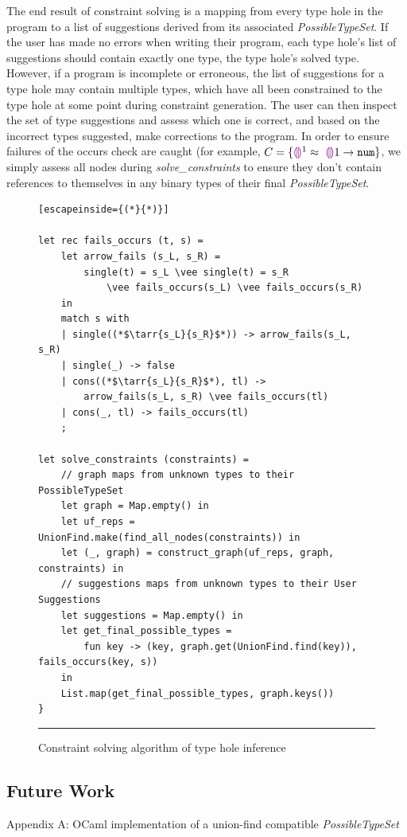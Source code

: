 The end result of constraint solving is a mapping from every type hole in the program to a list of suggestions derived from its associated \textit{PossibleTypeSet}. If the user has made no errors when writing their program, each type hole's list of suggestions should contain exactly one type, the type hole's solved type. However, if a program is incomplete or erroneous, the list of suggestions for a type hole may contain multiple types, which have all been constrained to the type hole at some point during constraint generation. The user can then inspect the set of type suggestions and assess which one is correct, and based on the incorrect types suggested, make corrections to the program. In order to ensure failures of the occurs check are caught (for example, $C = \{ \textcolor{violet}{\llparenthesis}\textcolor{violet}{\rrparenthesis}^{1} \approx~ \textcolor{violet}{\llparenthesis}\textcolor{violet}{\rrparenthesis}{1} \rightarrow \mathtt{num} \}$, we simply assess all nodes during \textit{solve\_constraints} to ensure they don't contain references to themselves in any binary types of their final \textit{PossibleTypeSet}.

\begin{figure}[htbp]
\begin{lstlisting}[escapeinside={(*}{*)}]

let rec fails_occurs (t, s) =
    let arrow_fails (s_L, s_R) =
        single(t) = s_L \vee single(t) = s_R 
            \vee fails_occurs(s_L) \vee fails_occurs(s_R)
    in
    match s with
    | single((*$\tarr{s_L}{s_R}$*)) -> arrow_fails(s_L, s_R)
    | single(_) -> false
    | cons((*$\tarr{s_L}{s_R}$*), tl) -> 
        arrow_fails(s_L, s_R) \vee fails_occurs(tl)
    | cons(_, tl) -> fails_occurs(tl)
    ;

let solve_constraints (constraints) =
    // graph maps from unknown types to their PossibleTypeSet
    let graph = Map.empty() in
    let uf_reps = UnionFind.make(find_all_nodes(constraints)) in
    let (_, graph) = construct_graph(uf_reps, graph, constraints) in
    // suggestions maps from unknown types to their User Suggestions
    let suggestions = Map.empty() in
    let get_final_possible_types = 
        fun key -> (key, graph.get(UnionFind.find(key)), fails_occurs(key, s))
    in
    List.map(get_final_possible_types, graph.keys())
}

\end{lstlisting}
\vspace{-4px}
 \hrule
\caption{Constraint solving algorithm of type hole inference}
\label{fig:algcode}
\end{figure}

\subsection{Future Work}

Appendix A: OCaml implementation of a union-find compatible \textit{PossibleTypeSet}